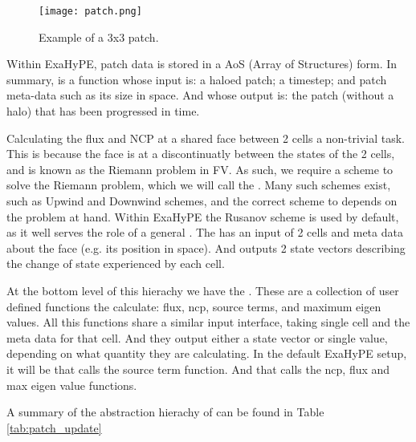 \begin{figure}[h!]
    \begin{center}
        \texttt{[image: patch.png]}
        \caption{Example of a 3x3 patch.}
        \label{fig:patch}
    \end{center}
\end{figure}

Within ExaHyPE, patch data is stored in a AoS (Array of Structures) form.
In summary,  is a function whose input is: a haloed patch; a timestep; and patch meta-data such as its size in space. And whose output is: the patch (without a halo) that has been progressed in time. 

Calculating the flux and NCP at a shared face between 2 cells a non-trivial task.
This is because the face is at a discontinuatly between the states of the 2 cells, and is known as the Riemann problem in FV.
As such, we require a scheme to solve the Riemann problem, which we will call the .
Many such schemes exist, such as Upwind and Downwind schemes, and the correct scheme to depends on the problem at hand.
Within ExaHyPE the Rusanov scheme \cite{rusanov} is used by default, as it well serves the role of a general .
The  has an input of 2 cells and meta data about the face (e.g. its position in space).
And outputs 2 state vectors describing the change of state experienced by each cell.

At the bottom level of this hierachy we have the .
These are a collection of user defined functions the calculate: flux, ncp, source terms, and maximum eigen values.
All this functions share a similar input interface, taking single cell and the meta data for that cell.
And they output either a state vector or single value, depending on what quantity they are calculating.
In the default ExaHyPE setup, it will be  that calls the source term function.
And  that calls the ncp, flux and max eigen value functions.

A summary of the abstraction hierachy of  can be found in Table \ref{tab:patch_update}

